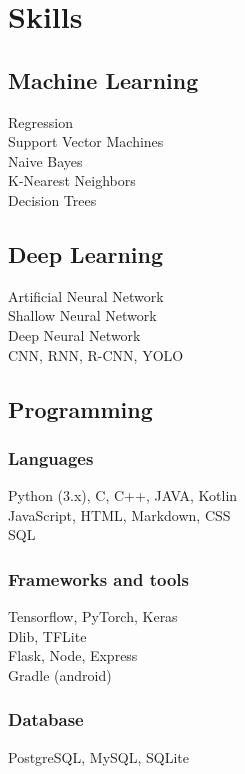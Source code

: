 \section{Skills}

\subsection{Machine Learning}
Regression \\
Support Vector Machines \\
Naive Bayes \\
K-Nearest Neighbors \\
Decision Trees \\

\sectionspace %

\subsection{Deep Learning}
Artificial Neural Network \\
Shallow Neural Network \\
Deep Neural Network \\
CNN, RNN, R-CNN, YOLO \\

\sectionspace

\subsection{Programming}

\subsubsection*{Languages}
Python (3.x), C, C++, JAVA, Kotlin \\
JavaScript, HTML, Markdown, CSS \\
SQL \\

\subsubsection*{Frameworks and tools}
Tensorflow, PyTorch, Keras\\
Dlib, TFLite \\
Flask, Node, Express \\
Gradle (android) \\

\subsubsection*{Database}
PostgreSQL, MySQL, SQLite \\

